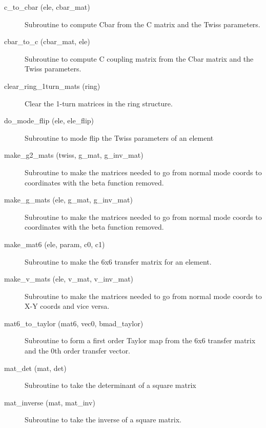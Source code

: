 \begin{description}

\item[c\_to\_cbar (ele, cbar\_mat)] \Newline
Subroutine to compute Cbar from the C matrix and the Twiss parameters. 

\item[cbar\_to\_c (cbar\_mat, ele)] \Newline
Subroutine to compute C coupling matrix from the Cbar matrix and the Twiss parameters. 

\item[clear\_ring\_1turn\_mats (ring)] \Newline
Clear the 1-turn matrices in the ring structure. 

\item[do\_mode\_flip (ele, ele\_flip)] \Newline
Subroutine to mode flip the Twiss parameters of an element 

\item[make\_g2\_mats (twiss, g\_mat, g\_inv\_mat)] \Newline
Subroutine to make the matrices needed to go from normal mode coords to 
coordinates with the beta function removed. 

\item[make\_g\_mats (ele, g\_mat, g\_inv\_mat)] \Newline
Subroutine to make the matrices needed to go from normal mode coords to 
coordinates with the beta function removed. 

\item[make\_mat6 (ele, param, c0, c1)] \Newline
Subroutine to make the 6x6 transfer matrix for an element. 

\item[make\_v\_mats (ele, v\_mat, v\_inv\_mat)] \Newline
Subroutine to make the matrices needed to go from normal mode coords to X-Y 
coords and vice versa. 

\item[mat6\_to\_taylor (mat6, vec0, bmad\_taylor)] \Newline
Subroutine to form a first order Taylor map from the 6x6 transfer matrix 
and the 0th order transfer vector. 

\item[mat\_det (mat, det)] \Newline 
     Subroutine to take the determinant of a square matrix

\item[mat\_inverse (mat, mat\_inv)] \Newline
Subroutine to take the inverse of a square matrix. 


\end{description}
